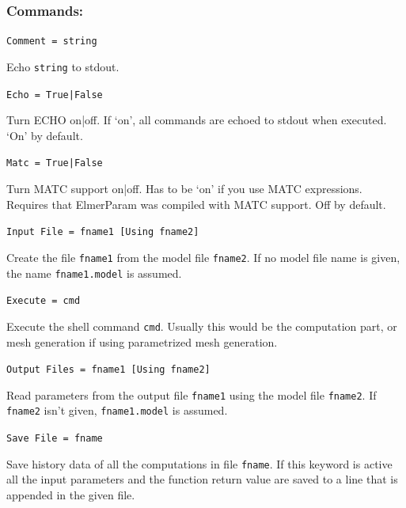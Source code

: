 \documentclass[12pt,a4paper]{article}
\newcommand{\code}[1]{\texttt{#1}}
\begin{document}
\subsubsection{Commands:}
\begin{description}

\item{\code{Comment = string}}

Echo \code{string} to stdout.

\item{\code{Echo = True|False}}

Turn ECHO on|off.  If `on', all commands are echoed to stdout when executed.
`On' by default.

\item{\code{Matc = True|False}}

Turn MATC support on|off. Has to be `on' if you use MATC expressions.
Requires that ElmerParam was compiled with MATC support. Off by default.  

\item{\code{Input File = fname1 [Using fname2]}}

Create the file \code{fname1} from the model file
\code{fname2}. If no model file name is given, the name
\code{fname1.model} is assumed.

\item{\code{Execute = cmd}}

Execute the shell command \code{cmd}.  Usually this would be the
computation part, or mesh generation if using parametrized mesh
generation.

\item{\code{Output Files = fname1 [Using fname2]}}

Read parameters from the output file \code{fname1} using the model file
\code{fname2}. If \code{fname2} isn't given, \code{fname1.model} is
assumed.

\item{\code{Save File = fname}}

Save history data of all the computations in file \code{fname}.  If
this keyword is active all the input parameters and the function return
value are saved to a line that is appended in the given file.

%

%


\end{description}
\end{document}
